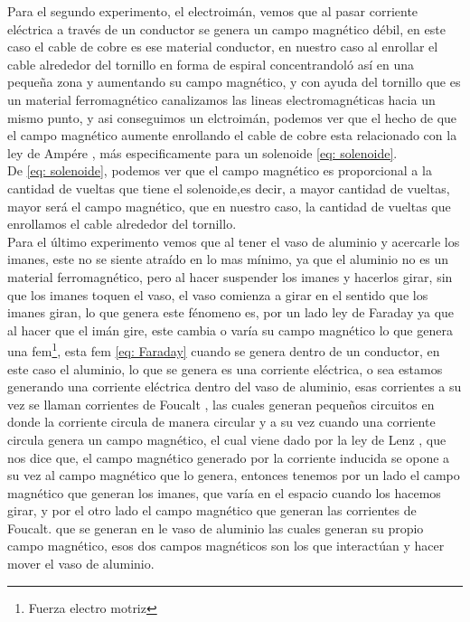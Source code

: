 \documentclass[]{article}
\begin{document}
\begin{multicols*}{2}
Para el segundo experimento, el electroimán, vemos que al pasar corriente eléctrica a través de un conductor se genera un campo magnético débil, en este caso el cable de cobre es ese material conductor, en nuestro caso al enrollar el cable alrededor del 
tornillo en forma de espiral concentrandoló así en una pequeña zona y aumentando su campo magnético, y con ayuda del tornillo que es un material ferromagnético canalizamos las lineas electromagnéticas hacia un mismo punto, y asi conseguimos un elctroimán, podemos ver que 
el hecho de que el campo magnético aumente enrollando el cable de cobre esta relacionado con la ley de Ampére \cite{Ley-de-Ampere}, más especificamente para un solenoide \eqref{eq: solenoide}. \\
De \eqref{eq: solenoide}, podemos ver que el campo magnético es proporcional a la cantidad de vueltas que tiene el solenoide,es decir, a mayor cantidad de vueltas,  mayor será el campo magnético, que en nuestro caso, la cantidad de vueltas que enrollamos el cable alrededor del tornillo.\\ 

\vspace{0.3cm}
Para el último experimento vemos que al tener el vaso de aluminio y acercarle los imanes, este no se siente atraído en lo mas mínimo, ya que el aluminio no es un material ferromagnético, pero al hacer suspender los imanes y hacerlos girar, sin que los imanes toquen el vaso, el vaso comienza 
a girar en el sentido que  los imanes giran, lo que genera este fénomeno es, por un lado ley de Faraday \cite{Ley-de-Faraday} ya que al hacer que el imán gire, este cambia o varía su campo magnético lo que genera una fem\footnote[1]{Fuerza electro motriz}, 
esta fem \eqref{eq: Faraday} cuando se genera dentro de un conductor, en este caso el aluminio, lo que se genera es una corriente eléctrica, o sea estamos generando una corriente eléctrica dentro del vaso de aluminio, esas corrientes a su vez se llaman corrientes de Foucalt \cite{Corrientes-de-Foucault}, las cuales 
generan pequeños circuitos en donde la corriente circula de manera circular y a su vez cuando una corriente circula genera un campo magnético, el cual viene dado por la ley de Lenz \cite{Ley-de-Faraday}, que nos dice que, el campo magnético generado por la corriente inducida se opone a su vez al campo magnético que lo genera,
 entonces tenemos por un lado el campo magnético que generan los imanes, que varía en el espacio cuando los hacemos girar, y por el otro lado el campo magnético que generan las corrientes de Foucalt. que se generan en le vaso de aluminio las cuales generan su propio campo magnético, esos dos campos magnéticos son los que interactúan y hacer mover el vaso de aluminio.




\end{multicols*}
\end{document}
